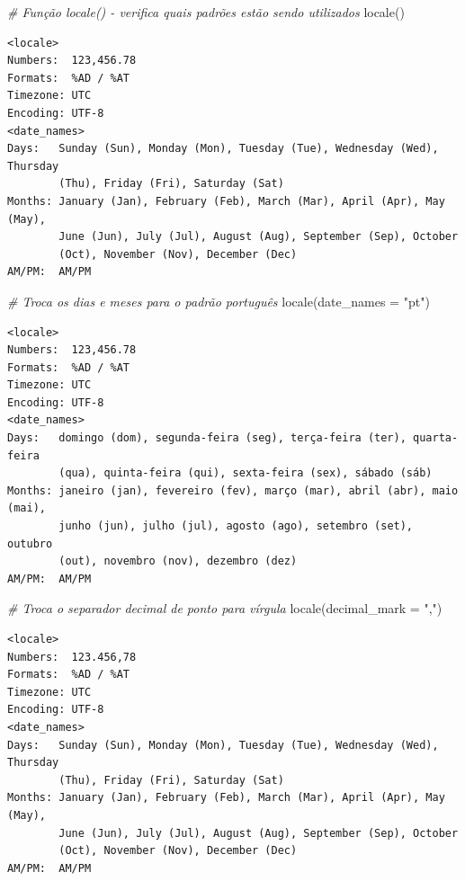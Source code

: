 \documentclass[
  brazilian,
]{book}
\newenvironment{Shaded}{\begin{snugshade}}{\end{snugshade}}
\newcommand{\AttributeTok}[1]{\textcolor[rgb]{0.77,0.63,0.00}{#1}}
\newcommand{\CommentTok}[1]{\textcolor[rgb]{0.56,0.35,0.01}{\textit{#1}}}
\newcommand{\FunctionTok}[1]{\textcolor[rgb]{0.00,0.00,0.00}{#1}}
\newcommand{\NormalTok}[1]{#1}
\newcommand{\StringTok}[1]{\textcolor[rgb]{0.31,0.60,0.02}{#1}}
\begin{document}
\begin{Shaded}
\begin{Highlighting}[]
\CommentTok{\# Função locale() {-} verifica quais padrões estão sendo utilizados}
\FunctionTok{locale}\NormalTok{()}
\end{Highlighting}
\end{Shaded}

\begin{verbatim}
<locale>
Numbers:  123,456.78
Formats:  %AD / %AT
Timezone: UTC
Encoding: UTF-8
<date_names>
Days:   Sunday (Sun), Monday (Mon), Tuesday (Tue), Wednesday (Wed), Thursday
        (Thu), Friday (Fri), Saturday (Sat)
Months: January (Jan), February (Feb), March (Mar), April (Apr), May (May),
        June (Jun), July (Jul), August (Aug), September (Sep), October
        (Oct), November (Nov), December (Dec)
AM/PM:  AM/PM
\end{verbatim}

\begin{Shaded}
\begin{Highlighting}[]
\CommentTok{\# Troca os dias e meses para o padrão português}
\FunctionTok{locale}\NormalTok{(}\AttributeTok{date\_names =} \StringTok{"pt"}\NormalTok{)}
\end{Highlighting}
\end{Shaded}

\begin{verbatim}
<locale>
Numbers:  123,456.78
Formats:  %AD / %AT
Timezone: UTC
Encoding: UTF-8
<date_names>
Days:   domingo (dom), segunda-feira (seg), terça-feira (ter), quarta-feira
        (qua), quinta-feira (qui), sexta-feira (sex), sábado (sáb)
Months: janeiro (jan), fevereiro (fev), março (mar), abril (abr), maio (mai),
        junho (jun), julho (jul), agosto (ago), setembro (set), outubro
        (out), novembro (nov), dezembro (dez)
AM/PM:  AM/PM
\end{verbatim}

\begin{Shaded}
\begin{Highlighting}[]
\CommentTok{\# Troca o separador decimal de ponto para vírgula}
\FunctionTok{locale}\NormalTok{(}\AttributeTok{decimal\_mark =} \StringTok{","}\NormalTok{)}
\end{Highlighting}
\end{Shaded}

\begin{verbatim}
<locale>
Numbers:  123.456,78
Formats:  %AD / %AT
Timezone: UTC
Encoding: UTF-8
<date_names>
Days:   Sunday (Sun), Monday (Mon), Tuesday (Tue), Wednesday (Wed), Thursday
        (Thu), Friday (Fri), Saturday (Sat)
Months: January (Jan), February (Feb), March (Mar), April (Apr), May (May),
        June (Jun), July (Jul), August (Aug), September (Sep), October
        (Oct), November (Nov), December (Dec)
AM/PM:  AM/PM
\end{verbatim}
\end{document}
